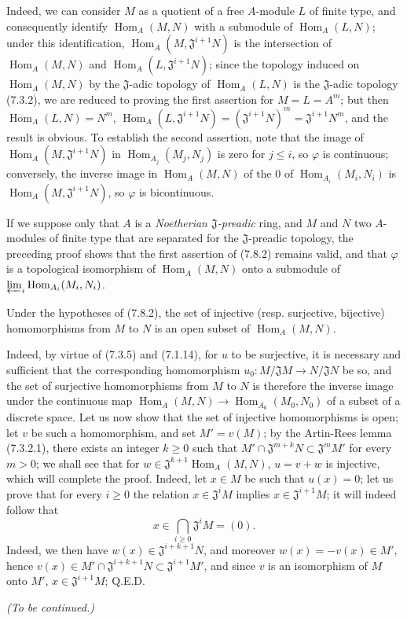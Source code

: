 Indeed, we can consider $M$ as a quotient of a free $A$-module $L$ of
finite type, and consequently identify $\operatorname{Hom}_A(M,N)$ with a submodule of
$\operatorname{Hom}_A(L,N)$; under this identification,
$\operatorname{Hom}_A(M,\mathfrak J^{i+1}N)$ is the intersection of $\operatorname{Hom}_A(M,N)$ and
$\operatorname{Hom}_A(L,\mathfrak J^{i+1}N)$; since the topology induced on
$\operatorname{Hom}_A(M,N)$ by the $\mathfrak J$-adic topology of $\operatorname{Hom}_A(L,N)$ is
the $\mathfrak J$-adic topology (7.3.2), we are reduced to proving the
first assertion
for $M=L=A^m$; but then $\operatorname{Hom}_A(L,N)=N^m$,
$\operatorname{Hom}_A(L,\mathfrak J^{i+1}N)=(\mathfrak J^{i+1}N)^m=
\mathfrak J^{i+1}N^m$, and the result is obvious. To establish the second
assertion, note that the image of $\operatorname{Hom}_A(M,\mathfrak J^{i+1}N)$ in
$\operatorname{Hom}_{A_j}(M_j,N_j)$ is zero for $j\leq i$, so $\varphi$ is
continuous; conversely, the inverse image in $\operatorname{Hom}_A(M,N)$ of the $0$ of
$\operatorname{Hom}_{A_i}(M_i,N_i)$ is $\operatorname{Hom}_A(M,\mathfrak J^{i+1}N)$, so $\varphi$
is bicontinuous.

If we suppose only that $A$ is a \emph{Noetherian $\mathfrak J$-preadic}
ring, and $M$ and $N$ two $A$-modules of finite type that are separated for the
$\mathfrak J$-preadic topology, the preceding proof shows that
the first assertion of (7.8.2) remains valid, and that $\varphi$ is a
topological isomorphism of $\operatorname{Hom}_A(M,N)$ onto a submodule of
$\varprojlim_i\operatorname{Hom}_{A_i}(M_i,N_i)$.

\begin{proposition}[7.8.3]
\label{0.7.8.3}
Under the hypotheses of \textup{(7.8.2)}, the set of injective \textup{(resp.} surjective,
bijective) homomorphisms from $M$ to $N$ is an open subset of
$\operatorname{Hom}_A(M,N)$.
\end{proposition}

Indeed, by virtue of (7.3.5) and (7.1.14), for $u$ to be surjective, it is
necessary and sufficient that the corresponding homomorphism
$u_0:M/\mathfrak JM\to N/\mathfrak JN$ be so, and the set of
surjective homomorphisms from $M$ to $N$ is therefore the inverse image under
the continuous map $\operatorname{Hom}_A(M,N)\to\operatorname{Hom}_{A_0}(M_0,N_0)$ of a subset
of a discrete space. Let us now show that the set of injective homomorphisms
is open; let $v$ be such a homomorphism, and set $M'=v(M)$;
by the Artin-Rees lemma (7.3.2.1), there exists an integer $k\geq 0$ such that
$M'\cap\mathfrak J^{m+k}N\subset\mathfrak J^mM'$ for every $m>0$; we
shall see that for $w\in\mathfrak J^{k+1}\operatorname{Hom}_A(M,N)$,
$u=v+w$ is injective, which will complete the proof. Indeed, let
$x\in M$ be such that $u(x)=0$; let us prove that for every $i\geq 0$ the relation
$x\in\mathfrak J^iM$ implies $x\in\mathfrak J^{i+1}M$; it will indeed
follow that
\[
  x\in\bigcap_{i\geq 0}\mathfrak J^iM=(0).
\]
Indeed, we then have $w(x)\in\mathfrak J^{i+k+1}N$, and moreover
$w(x)=-v(x)\in M'$, hence
$v(x)\in M'\cap\mathfrak J^{i+k+1}N\subset\mathfrak J^{i+1}M'$, and since
$v$ is an isomorphism of $M$ onto $M'$, $x\in\mathfrak J^{i+1}M$;
Q.E.D.

\begin{flushright}
\emph{(To be continued.)}
\end{flushright}

